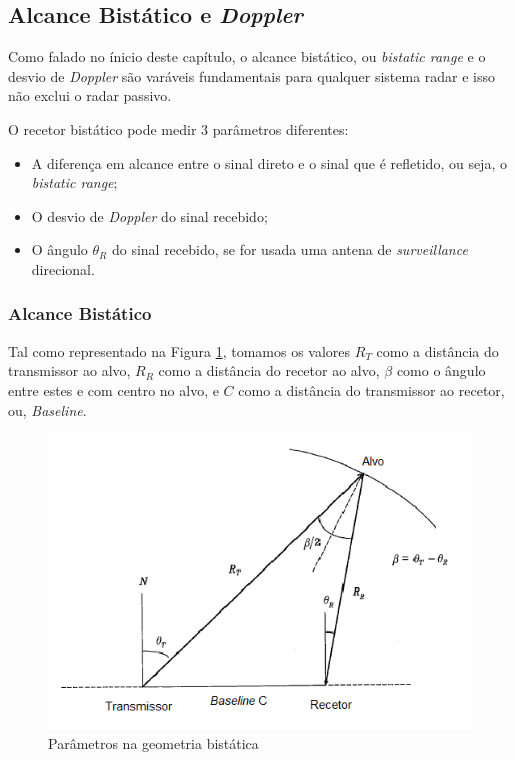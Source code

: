 \subsection{Alcance Bistático e \textit{Doppler}}
Como falado no ínicio deste capítulo, o alcance bistático, ou \textit{bistatic range} e o desvio de \textit{Doppler} são varáveis fundamentais para qualquer sistema radar e isso não exclui o radar passivo.\par 
O recetor bistático pode medir 3 parâmetros diferentes:
\begin{itemize}
\item A diferença em alcance entre o sinal direto e o sinal que é refletido, ou seja, o \textit{bistatic range};
\item O desvio de \textit{Doppler} do sinal recebido;
\item O ângulo $\theta_{R}$ do sinal recebido, se for usada uma antena de \textit{surveillance }direcional.
\end{itemize}

\subsubsection*{Alcance Bistático} \label{subchapter:alcance_bistatico}
Tal como representado na Figura \ref{fig:geom}, tomamos os valores $R_{T}$ como a distância do transmissor ao alvo,  $R_{R}$ como a distância do recetor ao alvo,  $\beta$ como o ângulo entre estes e com centro no alvo, e  $C$ como a distância do transmissor ao recetor, ou, \textit{Baseline}.\par


\begin{figure}[h]
\centering
\includegraphics[scale=0.9]{chapters/ch2/assets/geom}
\caption[Parâmetros na geometria bistática]{Parâmetros na geometria bistática}
\label{fig:geom}
\end{figure}

